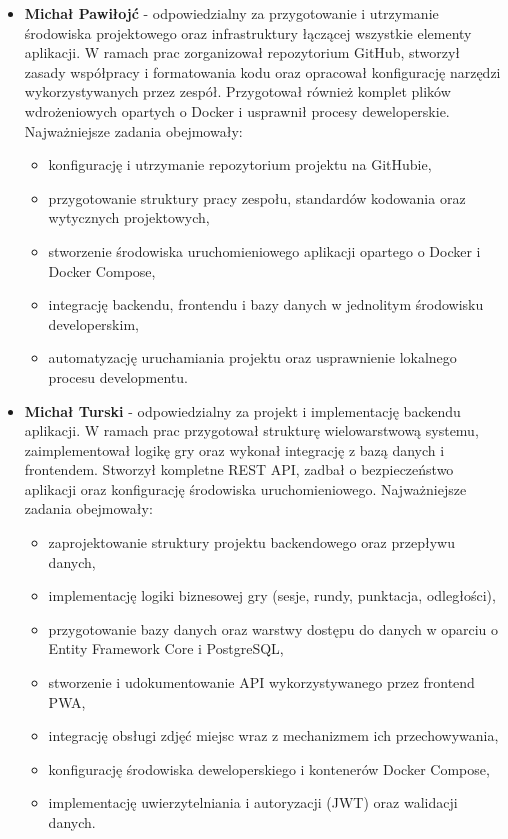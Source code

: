 \begin{itemize}
  \item \textbf{Michał Pawiłojć} - odpowiedzialny za przygotowanie i utrzymanie środowiska projektowego oraz infrastruktury łączącej wszystkie elementy aplikacji. W ramach prac zorganizował repozytorium GitHub, stworzył zasady współpracy i formatowania kodu oraz opracował konfigurację narzędzi wykorzystywanych przez zespół. Przygotował również komplet plików wdrożeniowych opartych o Docker i usprawnił procesy deweloperskie.
      Najważniejsze zadania obejmowały:
      \begin{itemize}
        \item konfigurację i utrzymanie repozytorium projektu na GitHubie,
        \item przygotowanie struktury pracy zespołu, standardów kodowania oraz wytycznych projektowych,
        \item stworzenie środowiska uruchomieniowego aplikacji opartego o Docker i Docker Compose,
        \item integrację backendu, frontendu i bazy danych w jednolitym środowisku developerskim,
        \item automatyzację uruchamiania projektu oraz usprawnienie lokalnego procesu developmentu.
      \end{itemize}
\newpage
  \item \textbf{Michał Turski} - odpowiedzialny za projekt i implementację backendu aplikacji. W ramach prac przygotował strukturę wielowarstwową systemu, zaimplementował logikę gry oraz wykonał integrację z bazą danych i frontendem. Stworzył kompletne REST API, zadbał o bezpieczeństwo aplikacji oraz konfigurację środowiska uruchomieniowego.
        Najważniejsze zadania obejmowały:
        \begin{itemize}
          \item zaprojektowanie struktury projektu backendowego oraz przepływu danych,
          \item implementację logiki biznesowej gry (sesje, rundy, punktacja, odległości),
          \item przygotowanie bazy danych oraz warstwy dostępu do danych w oparciu o Entity Framework Core i PostgreSQL,
          \item stworzenie i udokumentowanie API wykorzystywanego przez frontend PWA,
          \item integrację obsługi zdjęć miejsc wraz z mechanizmem ich przechowywania,
          \item konfigurację środowiska deweloperskiego i kontenerów Docker Compose,
          \item implementację uwierzytelniania i autoryzacji (JWT) oraz walidacji danych.
        \end{itemize}


\end{itemize}
